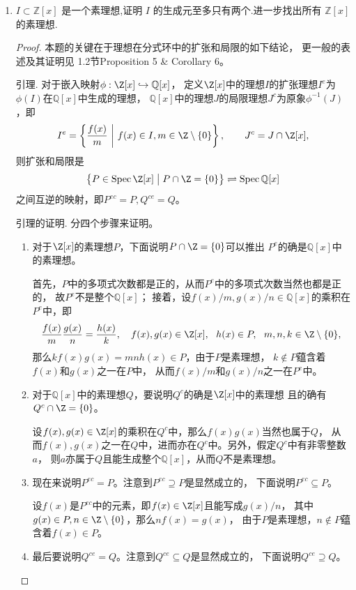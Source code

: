 \begin{enumerate}
\item $ I \subset \mathbb{Z}[x] $ 是一个素理想,证明 $ I $ 的生成元至多只有两个.进一步找出所有 $ \mathbb{Z}[x] $ 的素理想.
\begin{proof}
    本题的关键在于理想在分式环中的扩张和局限的如下结论，
    更一般的表述及其证明见\cite{Bo} 1.2节Proposition 5 \& Corollary 6。

    引理. 对于嵌入映射$\phi:\Z[x]\hookrightarrow\mathbb{Q}[x]$，
    定义$\Z[x]$中的理想$I$的扩张理想$I^e$为$\phi(I)$在$\mathbb{Q}[x]$中生成的理想，
    $\mathbb{Q}[x]$中的理想$J$的局限理想$J^c$为原象$\phi^{-1}(J)$，即
    \[I^e=\left\{\frac{f(x)}{m}\ \middle|\ f(x) \in I,m\in\Z\setminus\{0\}\right\},
    \qquad J^c=J\cap\Z[x],\]
    则扩张和局限是
    \[\big\{P\in\operatorname{Spec}\Z[x]\bigm|P\cap\Z=\{0\}\big\}
    \rightleftharpoons\operatorname{Spec}\mathbb{Q}[x]\]
    之间互逆的映射，即$P^{ec}=P,Q^{ce}=Q$。

    引理的证明. 分四个步骤来证明。
    \begin{enumerate}[label=(\roman*)]
    \item 对于$\Z[x]$的素理想$P$，下面说明$P\cap\Z=\{0\}$可以推出
    $P^e$的确是$\mathbb{Q}[x]$中的素理想。
    
    首先，$P$中的多项式次数都是正的，从而$P^e$中的多项式次数当然也都是正的，
    故$P^e$不是整个$\mathbb{Q}[x]$；
    接着，设$f(x)/m,g(x)/n\in\mathbb{Q}[x]$的乘积在$P^e$中，即
    \[\frac{f(x)}{m}\frac{g(x)}{n}=\frac{h(x)}{k},
    \quad f(x),g(x)\in\Z[x],\ \ h(x) \in P,\ \ m,n,k\in\Z\setminus\{0\},\]
    那么$kf(x)g(x)=mnh(x) \in P$，由于$P$是素理想，
    $k \notin P$蕴含着$f(x)$和$g(x)$之一在$P$中，
    从而$f(x)/m$和$g(x)/n$之一在$P^e$中。
    \item 对于$\mathbb{Q}[x]$中的素理想$Q$，要说明$Q^c$的确是$\Z[x]$中的素理想
    且的确有$Q^c\cap\Z=\{0\}$。
    
    设$f(x),g(x)\in\Z[x]$的乘积在$Q^c$中，那么$f(x)g(x)$当然也属于$Q$，
    从而$f(x),g(x)$之一在$Q$中，进而亦在$Q^c$中。另外，假定$Q^c$中有非零整数$a$，
    则$a$亦属于$Q$且能生成整个$\mathbb{Q}[x]$，从而$Q$不是素理想。
    \item 现在来说明$P^{ec}=P$。注意到$P^{ec} \supseteq P$是显然成立的，
    下面说明$P^{ec} \subseteq P$。

    设$f(x)$是$P^{ec}$中的元素，即$f(x)\in\Z[x]$且能写成$g(x)/n$，
    其中$g(x) \in P,n\in\Z\setminus\{0\}$，那么$nf(x)=g(x)$，
    由于$P$是素理想，$n \notin P$蕴含着$f(x) \in P$。
    \item 最后要说明$Q^{ce}=Q$。注意到$Q^{ce} \subseteq Q$是显然成立的，
    下面说明$Q^{ce} \supseteq Q$。


\end{enumerate}
\end{proof}
\end{enumerate}
